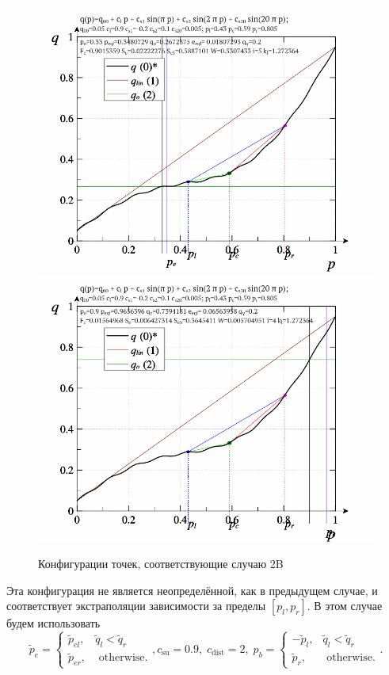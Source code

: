 \begin{figure}[htb!]
  \centerline{
    \includegraphics[width=49\TW]{p/pq_sin-p_pq_po=033.png}
    \hfill
    \includegraphics[width=49\TW]{p/pq_sin-p_pq_po=090.png}
  }
  \caption{Конфигурации точек, соответствующие случаю 2B}
  \label{atu:f:pq_2B}
\end{figure}

Эта конфигурация не является неопределённой, как в предыдущем случае,
и соответствует экстраполяции зависимости за пределы $[p_l, p_r]$.
В этом случае будем использовать
%
\begin{equation}
  \tilde{p}_e
  =
  \begin{cases}
    \tilde{p}_{el}, & \tilde{q}_l < \tilde{q}_r
    \\
    \tilde{p}_{er}, & \text{ otherwise}.
  \end{cases}
  ,
  c_\mathrm{su} = 0.9, \;  c_\mathrm{dist} = 2,  \;
  p_b =
  \begin{cases}
    -\tilde{p}_l, & \tilde{q}_l < \tilde{q}_r
    \\
    \tilde{p}_r, & \text{ otherwise}.
  \end{cases}.
  \label{atu:eq:pr_e2B}
\end{equation}

